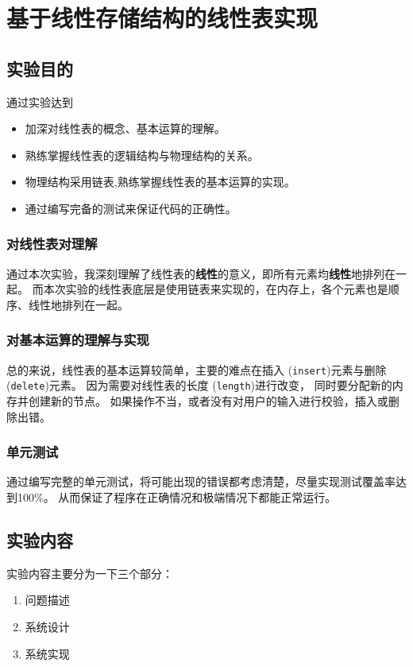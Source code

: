 \chapter{基于线性存储结构的线性表实现}\label{chapter:2}

\section{实验目的}\label{sec:test21}
通过实验达到
\begin{itemize}
    \item 加深对线性表的概念、基本运算的理解。
    \item 熟练掌握线性表的逻辑结构与物理结构的关系。
    \item 物理结构采用链表,熟练掌握线性表的基本运算的实现。
    \item 通过编写完备的测试来保证代码的正确性。
\end{itemize}

\subsection{对线性表对理解}
通过本次实验，我深刻理解了线性表的\textbf{线性}的意义，即所有元素均\textbf{线性}地排列在一起。
\newline
而本次实验的线性表底层是使用链表来实现的，在内存上，各个元素也是顺序、线性地排列在一起。
\subsection{对基本运算的理解与实现}
总的来说，线性表的基本运算较简单，主要的难点在插入 (\texttt{insert})元素与删除 (\texttt{delete})元素。
因为需要对线性表的长度 (\texttt{length})进行改变，
同时要分配新的内存并创建新的节点。
如果操作不当，或者没有对用户的输入进行校验，插入或删除出错。
\subsection{单元测试}
通过编写完整的单元测试，将可能出现的错误都考虑清楚，尽量实现测试覆盖率达到100\%。
从而保证了程序在正确情况和极端情况下都能正常运行。


\section{实验内容}\label{sec:test22}
    实验内容主要分为一下三个部分：
\begin{enumerate}
    \item 问题描述
    \item 系统设计
    \item 系统实现
\end{enumerate}
